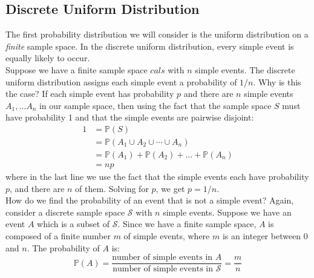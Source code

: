 \documentclass[12pt]{article}
\theoremstyle{definition}
\theoremstyle{remark}
\def\P{{\mathbb P}}
\def\cals{{\mathcal S}}
\begin{document}

\subsection{Discrete Uniform Distribution}
The first probability distribution we will consider is the uniform distribution on a \emph{finite} sample space. In the discrete uniform distribution, every simple event is equally likely to occur. \\

Suppose we have a finite sample space $cals$ with $n$ simple events. The discrete uniform distribution assigns each simple event a probability of $1/n$. Why is this the case? If each simple event has probability $p$ and there are $n$ simple events $A_1, \dots A_n$ in our sample space, then using the fact that the sample space $S$ must have probability 1 and that the simple events are pairwise disjoint:
\begin{align*}
1 &= \P(S) \\
&= \P(A_1 \cup A_2 \cup \cdots \cup A_n) \\
&= \P(A_1) + \P(A_2) + \dots + \P(A_n) \\
&= np
\end{align*}
where in the last line we use the fact that the simple events each have probability $p$, and there are $n$ of them. Solving for $p$, we get $p = 1/n$.\\

How do we find the probability of an event that is not a simple event? Again, consider a discrete sample space $\cals$ with $n$ simple events. Suppose we have an event $A$ which is a subset of $\cals$. Since we have a finite sample space, $A$ is composed of a finite number $m$ of simple events, where $m$ is an integer between 0 and $n$. The probability of $A$ is:
\[
\P(A) = \frac{ \text{number of simple events in $A$}}{\text{number of simple events in $\cals$}} = \frac{m}{n}
\]
\end{document}
